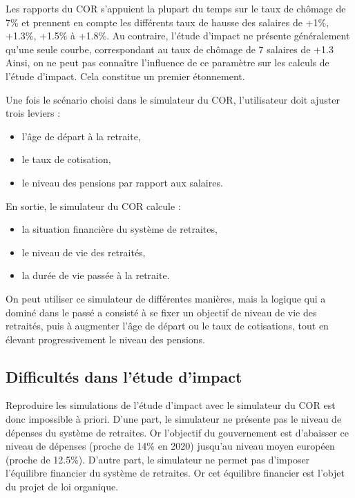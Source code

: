 \documentclass[10pt]{article}
\begin{document}
Les rapports du COR s'appuient la plupart du temps sur le taux 
de chômage de 7\% et prennent en compte les différents taux de hausse 
des salaires de +1\%, +1.3\%, +1.5\% à +1.8\%. 
Au contraire, l'étude d'impact ne présente généralement qu'une seule 
courbe, correspondant au taux de chômage de 7%
salaires de +1.3%
Ainsi, on ne peut pas connaître l'influence de ce paramètre sur les calculs 
de l'étude d'impact. 
Cela constitue un premier étonnement. 

Une fois le scénario choisi dans le simulateur du COR, 
l'utilisateur doit ajuster trois leviers : 
\begin{itemize}
\item l'âge de départ à la retraite, 
\item le taux de cotisation, 
\item le niveau des pensions par rapport aux salaires. 
\end{itemize}

En sortie, le simulateur du COR calcule :
\begin{itemize}
\item la situation financière du système de retraites, 
\item le niveau de vie des retraités, 
\item la durée de vie passée à la retraite. 
\end{itemize}

On peut utiliser ce simulateur de différentes manières, mais la 
logique qui a dominé dans le passé a consisté à se fixer un objectif 
de niveau de vie des retraités, puis à augmenter l'âge de départ ou 
le taux de cotisations, tout en élevant progressivement le niveau des pensions. 


\subsection{Difficultés dans l'étude d'impact}

Reproduire les simulations de l'étude d'impact avec le simulateur du COR 
est donc impossible à priori. 
D'une part, le simulateur ne présente pas le niveau de dépenses du système 
de retraites. 
Or l'objectif du gouvernement est d'abaisser ce niveau de dépenses 
(proche de 14\% en 2020) jusqu'au niveau moyen européen (proche de 12.5\%). 
D'autre part, le simulateur ne permet pas d'imposer l'équilibre financier du système 
de retraites. 
Or cet équilibre financier est l'objet du projet de loi organique. 
\end{document}
